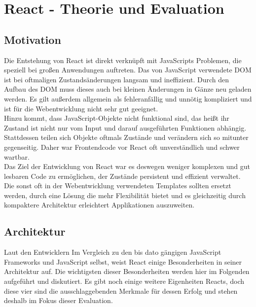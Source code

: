 
\chapter{React - Theorie und Evaluation}
  \label{Evalution React}

\section{Motivation}
Die Entstehung von React ist direkt verknüpft mit JavaScripts Problemen, die speziell bei großen Anwendungen auftreten. Das von JavaScript verwendete DOM ist bei oftmaligen Zustandsänderungen langsam und ineffizient. Durch den Aufbau des DOM muss dieses auch bei kleinen Änderungen in Gänze neu geladen werden. Es gilt außerdem allgemein als fehleranfällig und unnötig kompliziert und ist für die Webentwicklung nicht sehr gut geeignet. \\
Hinzu kommt, dass JavaScript-Objekte nicht funktional sind, das heißt ihr Zustand ist nicht nur vom Input und darauf ausgeführten Funktionen abhängig. Stattdessen teilen sich Objekte oftmals Zustände und verändern sich so mitunter gegenseitig. Daher war Frontendcode vor React oft unverständlich und schwer wartbar. \\
Das Ziel der Entwicklung von React war es deswegen weniger komplexen und gut lesbaren Code zu ermöglichen, der Zustände persistent und effizient verwaltet. Die sonst oft in der Webentwicklung verwendeten Templates sollten ersetzt werden, durch eine Lösung die mehr Flexibilität bietet und es gleichzeitig durch kompaktere Architektur erleichtert Applikationen auszuweiten.
\section{Architektur}
Laut den Entwicklern 
Im Vergleich zu den bis dato gängigen JavaScript Frameworks und JavaScript selbst, weist React einige Besonderheiten in seiner Architektur auf. Die wichtigsten dieser Besonderheiten werden hier im Folgenden aufgeführt und diskutiert. Es gibt noch einige weitere Eigenheiten Reacts, doch diese vier sind die ausschlaggebenden Merkmale für dessen Erfolg und stehen deshalb im Fokus dieser Evaluation.
